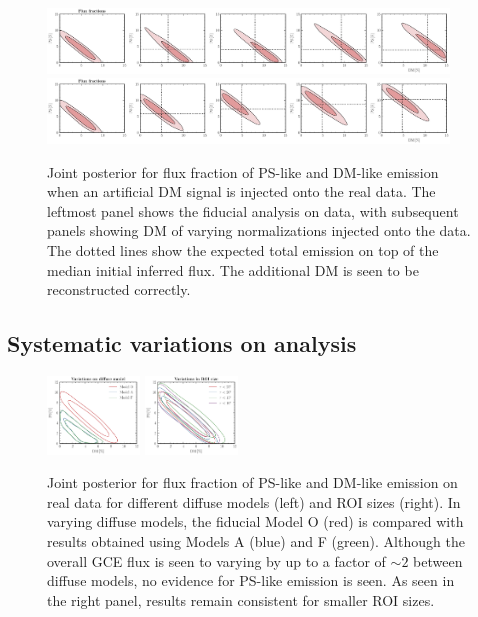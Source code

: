\documentclass[prd,aps,10pt,nofootinbib,twocolumn,superscriptaddress,preprintnumbers,balancelastpage,longbibliography]{revtex4-1}
\begin{document}
%
\begin{figure}
    \centering
    \includegraphics[width=0.95\textwidth]{plots/data_sig_inj_dm.pdf}
    \includegraphics[width=0.95\textwidth]{plots/data_sig_inj_ps.pdf}
    \caption{Joint posterior for flux fraction of PS-like and DM-like emission when an artificial DM signal is injected onto the real data. The leftmost panel shows the fiducial analysis on \Fermi data, with subsequent panels showing DM of varying normalizations injected onto the data. The dotted lines show the expected total emission on top of the median initial inferred flux. The additional DM is seen to be reconstructed correctly.}
    \label{fig:sig_inj_data}
\end{figure}
%

\subsection{Systematic variations on analysis}
\label{sec:systematics}

%
\begin{figure}
    \centering
    \includegraphics[width=0.22\textwidth]{plots/dif_var.pdf}
    \includegraphics[width=0.22\textwidth]{plots/roi_var.pdf}
    \caption{Joint posterior for flux fraction of PS-like and DM-like emission on real \Fermi data for different diffuse models (left) and ROI sizes (right). In varying diffuse models, the fiducial Model O (red) is compared with results obtained using Models A (blue) and F (green). Although the overall GCE flux is seen to varying by up to a factor of $\sim2$ between diffuse models, no evidence for PS-like emission is seen. As seen in the right panel, results remain consistent for smaller ROI sizes.}
    \label{fig:variations}
\end{figure}
%
\end{document}
